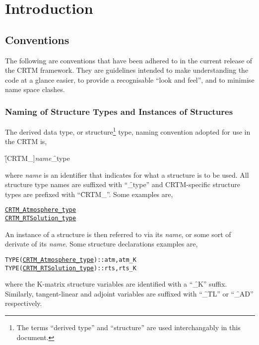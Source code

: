 \chapter{Introduction}


\section{Conventions}
\label{sec:conventions}
The following are conventions that have been adhered to in the current release of the CRTM framework. They are guidelines intended to make understanding the code at a glance easier, to provide a recognisable ``look and feel'', and to minimise name space clashes.



\subsection{Naming of Structure Types and Instances of Structures}

The derived data type, or structure\footnote{The terms ``derived type'' and ``structure'' are used interchangably in this document.} type, naming convention adopted for use in the CRTM is, 

\hspace{0.5cm}\f{[CRTM\_]}\textit{name}\f{\_type} 

where \textit{name} is an identifier that indicates for what a structure is to be used. All structure type names are suffixed with ``\f{\_type}'' and CRTM-specific structure types are prefixed with ``\f{CRTM\_}''. Some examples are,

\begin{alltt}
  \hyperref[sec:atmosphere_structure]{CRTM_Atmosphere_type}
  \hyperref[sec:rtsolution_structure]{CRTM_RTSolution_type}\end{alltt}

An instance of a structure is then referred to via its \textit{name}, or some sort of derivate of its \textit{name}. Some structure declarations examples are,

\begin{alltt}
  TYPE(\hyperref[sec:atmosphere_structure]{CRTM_Atmosphere_type}) :: atm, atm_K
  TYPE(\hyperref[sec:rtsolution_structure]{CRTM_RTSolution_type}) :: rts, rts_K\end{alltt}

where the K-matrix structure variables are identified with a ``\f{\_K}'' suffix. Similarly, tangent-linear and adjoint variables are suffixed with ``\f{\_TL}'' or ``\f{\_AD}'' respectively.



